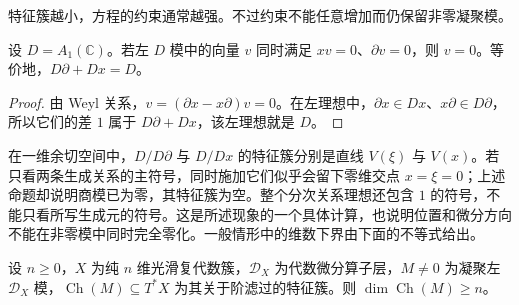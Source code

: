 特征簇越小，方程的约束通常越强。不过约束不能任意增加而仍保留非零凝聚模。

\begin{proposition}\label{b5:prop:D-simultaneous-annihilation}
	设 \(D=A_1(\mathbb C)\)。若左 \(D\) 模中的向量 \(v\) 同时满足 \(xv=0\)、\(\partial v=0\)，则 \(v=0\)。等价地，\(D\partial+Dx=D\)。
\end{proposition}
\begin{proof}
	由 Weyl 关系，\(v=(\partial x-x\partial)v=0\)。在左理想中，\(\partial x\in Dx\)、\(x\partial\in D\partial\)，所以它们的差 \(1\) 属于 \(D\partial+Dx\)，该左理想就是 \(D\)。
\end{proof}

在一维余切空间中，\(D/D\partial\) 与 \(D/Dx\) 的特征簇分别是直线 \(V(\xi)\) 与 \(V(x)\)。若只看两条生成关系的主符号，同时施加它们似乎会留下零维交点 \(x=\xi=0\)；上述命题却说明商模已为零，其特征簇为空。整个分次关系理想还包含 \(1\) 的符号，不能只看所写生成元的符号。这是\cite[Exercise 2.2.6, pp. 61--62]{HottaTakeuchiTanisaki2008DModules}所述现象的一个具体计算，也说明位置和微分方向不能在非零模中同时完全零化。一般情形中的维数下界由下面的不等式给出。

\begin{theorem}\label{b5:thm:D-bernstein}
	设 \(n\ge0\)，\(X\) 为纯 \(n\) 维光滑复代数簇，\(\mathcal D_X\) 为代数微分算子层，\(M\ne0\) 为凝聚左 \(\mathcal D_X\) 模，\(\operatorname{Ch}(M)\subseteq T^*X\) 为其关于阶滤过的特征簇。则 \(\dim\operatorname{Ch}(M)\ge n\)。
\end{theorem}

